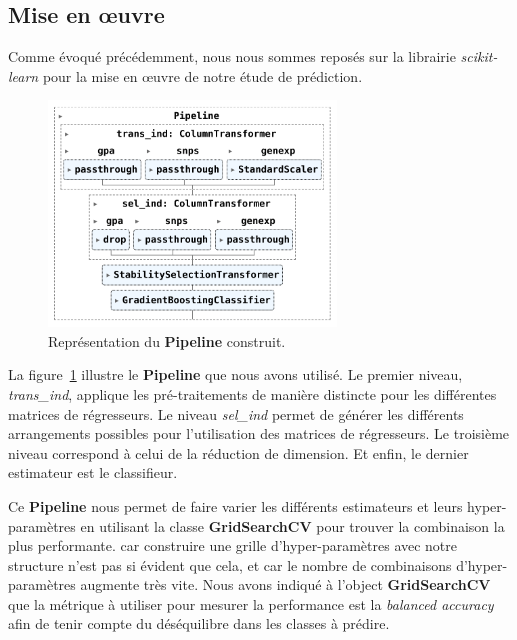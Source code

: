 \documentclass[11pt]{article}
\begin{document}
\hypertarget{mise-oeuvre}{%
\subsection{Mise en œuvre}\label{mise-oeuvre}}

  Comme évoqué précédemment, nous nous sommes reposés sur la librairie \textit{scikit-learn} pour la mise en œuvre de notre étude de prédiction.

  \begin{figure}[H]
    \centering
    \includegraphics[height=6cm,width=\textwidth,keepaspectratio]{pipe}
    \caption{Représentation du \textbf{Pipeline} construit.}
    \label{fig:pipe}
  \end{figure}

  La figure~\ref{fig:pipe} illustre le \textbf{Pipeline} que nous avons utilisé.
  Le premier niveau, \textit{trans\_ind}, applique les pré-traitements de manière distincte pour les différentes matrices de régresseurs.
  Le niveau \textit{sel\_ind} permet de générer les différents arrangements possibles pour l'utilisation des matrices de régresseurs.
  Le troisième niveau correspond à celui de la réduction de dimension.
  Et enfin, le dernier estimateur est le classifieur.

  Ce \textbf{Pipeline} nous permet de  faire varier les différents estimateurs et leurs hyper-paramètres en utilisant la classe \textbf{GridSearchCV} pour trouver la combinaison la plus performante.
   car construire une grille d'hyper-paramètres avec notre structure n'est pas si évident que cela, et car le nombre de combinaisons d'hyper-paramètres augmente très vite.
  Nous avons indiqué à l'object \textbf{GridSearchCV} que la métrique à utiliser pour mesurer la performance est la \textit{balanced accuracy} afin de tenir compte du déséquilibre dans les classes à prédire.

  
\end{document}
